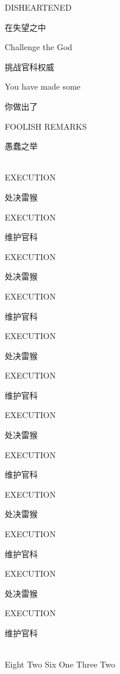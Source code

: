 \documentclass[UTF8,12pt,oneside]{ctexbook}
\begin{document}
\begin{center}
            DISHEARTENED
            
            在失望之中
            
            Challenge the God
            
            挑战官科权威
            
            You have made some
            
            你做出了
            
            FOOLISH REMARKS
            
            愚蠢之举

            ~\\
            EXECUTION
            
            处决雷猴
            
            EXECUTION
            
            维护官科
            
            EXECUTION
            
            处决雷猴
            
            EXECUTION
            
            维护官科
            
            EXECUTION
            
            处决雷猴
            
            EXECUTION
            
            维护官科
            
            EXECUTION
            
            处决雷猴
            
            EXECUTION
            
            维护官科
            
            EXECUTION
            
            处决雷猴
            
            EXECUTION
            
            维护官科
            
            EXECUTION
            
            处决雷猴
            
            EXECUTION
            
            维护官科
            
            ~\\
            Eight Two Six One Three Two
            

\end{center}
\end{document}
